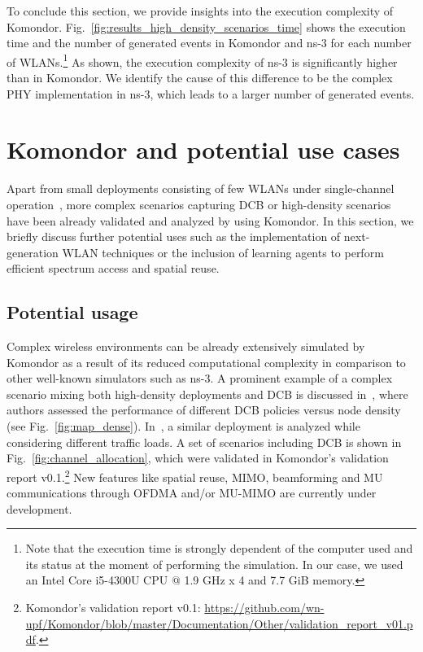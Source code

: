 \documentclass{article}
\begin{document}
	To conclude this section, we provide insights into the execution complexity of Komondor. Fig.~\ref{fig:results_high_density_scenarios_time} shows the execution time and the number of generated events in Komondor and ns-3 for each number of WLANs.\footnote[7]{Note that the execution time is strongly dependent of the computer used and its status at the moment of performing the simulation. In our case, we used an Intel Core i5-4300U CPU @ 1.9 GHz x 4 and 7.7 GiB memory.} As shown, the execution complexity of ns-3 is significantly higher than in Komondor. We identify the cause of this difference to be the complex PHY implementation in ns-3, which leads to a larger number of generated events.
	
	\section{Komondor and potential use cases}
	\label{section:potential}
	
	Apart from small deployments consisting of few WLANs under single-channel operation~\cite{wilhelmi2019potential}, more complex scenarios capturing DCB or high-density scenarios have been already validated and analyzed by using Komondor. In this section, we briefly discuss further potential uses such as the implementation of next-generation WLAN techniques or the inclusion of learning agents to perform efficient spectrum access and spatial reuse.
	
	\subsection{Potential usage}
	
	Complex wireless environments can be already extensively simulated by Komondor as a result of its reduced computational complexity in comparison to other well-known simulators such as ns-3. 	
	A prominent example of a complex scenario mixing both high-density deployments and DCB is discussed in~\cite{barrachina2019dynamic}, where authors assessed the performance of different DCB policies versus node density (see Fig.~\ref{fig:map_dense}). In~\cite{barrachina2019overlap}, a similar deployment is analyzed while considering different traffic loads.
	A set of scenarios including DCB is shown in Fig.~\ref{fig:channel_allocation}, which were validated in Komondor's validation report v0.1.\footnote[8]{Komondor's validation report v0.1: \url{https://github.com/wn-upf/Komondor/blob/master/Documentation/Other/validation\_report\_v01.pdf}.} New features like spatial reuse, MIMO, beamforming and MU communications through OFDMA and/or MU-MIMO are currently under development.
	
\end{document}
